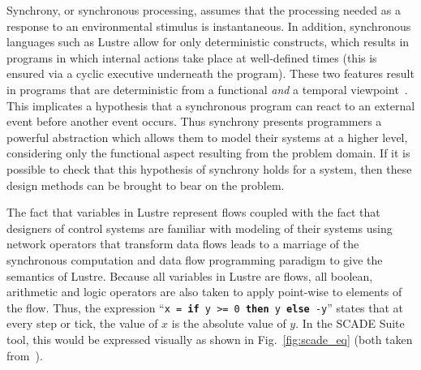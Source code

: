 Synchrony, or synchronous processing, assumes that the processing
needed as a response to an environmental stimulus is instantaneous. In
addition, synchronous languages such as Lustre allow for only
deterministic constructs, which results in programs in which internal
actions take place at well-defined times (this is ensured via a cyclic
executive underneath the program). These two features result in
programs that are deterministic from a functional \emph{and} a
temporal viewpoint~\cite{halbwachs@ieee91}. This implicates a
hypothesis that a synchronous program can react to an external event
before another event occurs. Thus synchrony presents programmers a
powerful abstraction which allows them to model their systems at a
higher level, considering only the functional aspect resulting from
the problem domain. If it is possible to check that this hypothesis of
synchrony holds for a system, then these design methods can be brought
to bear on the problem.

The fact that variables in Lustre represent flows coupled with the
fact that designers of control systems are familiar with modeling of
their systems using network operators that transform data flows leads
to a marriage of the synchronous computation and data flow programming
paradigm to give the semantics of Lustre. Because all variables in
Lustre are flows, all boolean, arithmetic and logic operators are also
taken to apply point-wise to elements of the flow. Thus, the
expression ``\texttt{x = \textbf{if} y >= 0 \textbf{then} y
  \textbf{else} -y}'' states that at every step or tick, the value of
$x$ is the absolute value of $y$. In the SCADE Suite tool, this would
be expressed visually as shown in Fig.~\ref{fig:scade_eq} (both taken
from~\cite{halbwachs@ieee03}).

